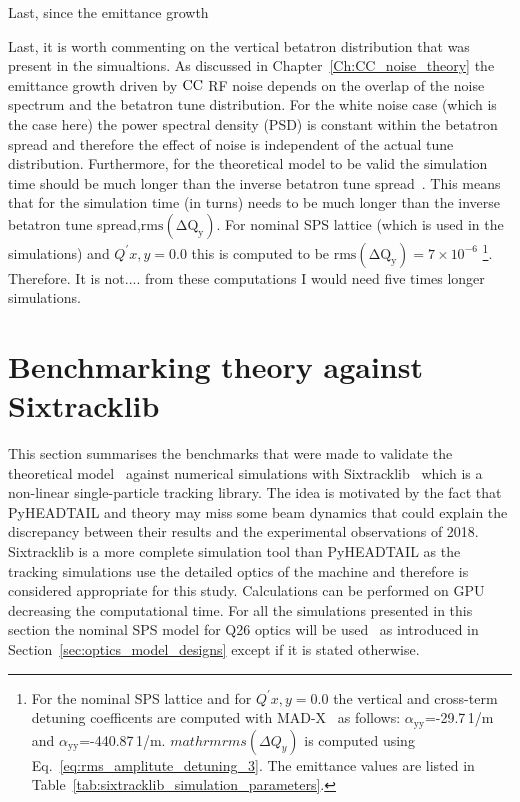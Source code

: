 Last, since the emittance growth 

Last, it is worth commenting on the vertical betatron distribution that was present in the simualtions. As discussed in Chapter~\ref{Ch:CC_noise_theory} the emittance growth driven by ${\mathrm{CC}}$ RF noise depends on the overlap of the noise spectrum and the betatron tune distribution. For the white noise case (which is the case here) the power spectral density (PSD) is constant within the betatron spread and therefore the effect of noise is independent of the actual tune distribution. Furthermore, for the theoretical model to be valid the simulation time should be much longer than the inverse betatron tune spread~\cite{PhysRevSTAB.18.101001}. This means that for the simulation time (in turns) needs to be much longer than the inverse betatron tune spread,$\mathrm{rms(\Delta Q_y)}$. For nominal SPS lattice (which is used in the simulations) and $Q^\prime{x,y=0.0}$ this is computed to be $\mathrm{rms(\Delta Q_y)} = 7\times 10^{-6}$ \footnote{For the nominal SPS lattice and for $Q^\prime{x,y=0.0}$ the vertical and cross-term detuning coefficents are computed with MAD-X~\cite{madx} as follows: $\alpha_\mathrm{yy}$=-29.7\,1/m and $\alpha_\mathrm{yy}$=-440.87\,1/m.  $mathrm{rms(\Delta Q_y)}$ is computed using Eq.~\eqref{eq:rms_amplitute_detuning_3}. The emittance values are listed in Table~\ref{tab:sixtracklib_simulation_parameters}.}. Therefore. It is not.... from these computations I would need five times longer simulations.







\section{Benchmarking theory against Sixtracklib}\label{sec:benchmark_theory_with_sixtracklib}
This section summarises the benchmarks that were made to validate the theoretical model~\cite{PhysRevSTAB.18.101001} against numerical simulations with Sixtracklib~\cite{sixtracklib_repo} which is a non-linear single-particle tracking library. The idea is motivated by the fact that PyHEADTAIL and theory may miss some beam dynamics that could explain the discrepancy between their results and the experimental observations of 2018. Sixtracklib is a more complete simulation tool than PyHEADTAIL as the tracking simulations use the detailed optics of the machine and therefore is considered appropriate for this study. Calculations can be performed on GPU decreasing the computational time. For all the simulations presented in this section the nominal SPS model for Q26 optics will be used~\cite{cern_optics_repo} as introduced in Section~\ref{sec:optics_model_designs} except if it is stated otherwise.



